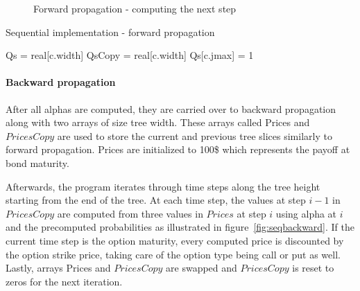 \begin{figure}[H]
    \centering
    \def\svgwidth{0.5\textwidth}
	\caption{Forward propagation - computing the next step}
    
	\label{fig:seqforward}
\end{figure}

\begin{algorithm}[H]
    \DontPrintSemicolon
    \setcounter{AlgoLine}{16}
    \caption{Sequential implementation - forward propagation\label{alg:sequential-forward}}
    
    \;
    Qs = real[c.width]\;
    QsCopy = real[c.width]\;
    Qs[c.jmax] = 1
    \;
\end{algorithm}

\pagebreak
\paragraph{Backward propagation}
After all alphas are computed, they are carried over to backward propagation along with two arrays of size tree width. These arrays called Prices and $PricesCopy$ are used to store the current and previous tree slices similarly to forward propagation. Prices are initialized to 100\$ which represents the payoff at bond maturity.

Afterwards, the program iterates through time steps along the tree height starting from the end of the tree. At each time step, the values at step $i-1$ in $PricesCopy$ are computed from three values in $Prices$ at step $i$ using alpha at $i$ and the precomputed probabilities as illustrated in figure~\ref{fig:seqbackward}. If the current time step is the option maturity, every computed price is discounted by the option strike price, taking care of the option type being call or put as well. Lastly, arrays Prices and $PricesCopy$ are swapped and $PricesCopy$ is reset to zeros for the next iteration.

